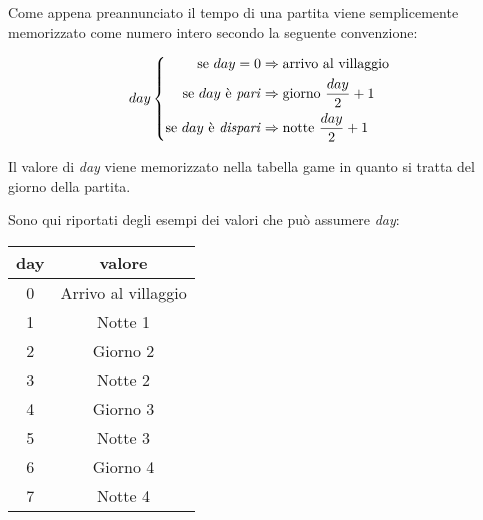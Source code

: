 Come appena preannunciato il tempo di una partita viene semplicemente memorizzato come numero intero secondo la seguente convenzione:

\[
day
\left\{
\begin{aligned}
\text{se}\ day = 0 						&\Rightarrow \text{arrivo al villaggio} \\
\text{se}\ day\ \text{è \emph{pari}}		&\Rightarrow \text{giorno}\ \frac{day}{2}+1 \\
\text{se}\ day\ \text{è \emph{dispari}}	&\Rightarrow \text{notte}\ \frac{day}{2}+1
\end{aligned}
\right.
\]

Il valore di \emph{day} viene memorizzato nella tabella game in quanto si tratta del giorno della partita.

Sono qui riportati degli esempi dei valori che può assumere \emph{day}:

\begin{tabular}{|c|c|}
	\hline
	\textbf{day} & \textbf{valore} \\
	\hline
	0 & Arrivo al villaggio \\
	1 & Notte 1 \\
	2 & Giorno 2 \\
	3 & Notte 2 \\
	4 & Giorno 3 \\
	5 & Notte 3 \\
	6 & Giorno 4 \\
	7 & Notte 4 \\
	\hline
\end{tabular}
